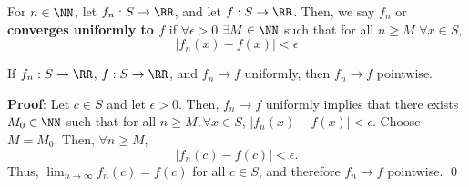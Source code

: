\begin{definition}
For $n\in \NN$, let $f_n:S\to \RR$, and let $f:S\to \RR$. Then, we say $f_n$  or \textbf{converges uniformly to $f$} if $\forall \epsilon>0$ $\exists M\in \NN$ such that for all $n\geq M$ $\forall x\in S$,
\[
|f_n(x) - f(x)|<\epsilon
\]
\end{definition}

\begin{theorem}
If $f_n:S\to \RR$, $f:S\to \RR$, and $f_n\to f$ uniformly, then $f_n\to f$ pointwise.
\end{theorem}
\textbf{Proof}: Let $c\in S$ and let $\epsilon>0$. Then, $f_n\to f$ uniformly implies that there exists $M_0\in \NN$ such that for all $n\geq M, \forall x\in S$, $|f_n(x)-f(x)|<\epsilon$. Choose $M=M_0$. Then, $\forall n\geq M$, 
\[
|f_n(c) - f(c)|< \epsilon.
\]
Thus, $\lim_{n\to \infty}f_n(c) = f(c)$ for all $c\in S$, and therefore $f_n\to f$ pointwise. \qed